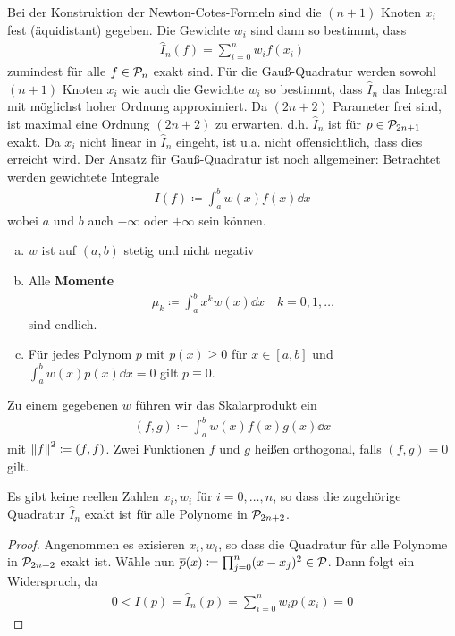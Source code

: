 Bei der Konstruktion der Newton-Cotes-Formeln sind die
$(n+1)$ Knoten $x_i$ fest (äquidistant) gegeben.
Die Gewichte $w_i$ sind dann so bestimmt, dass
\begin{gather*}
  \hat{I}_n(f) =\sum_{i=0}^n w_if(x_i)
\end{gather*}
zumindest für alle $f\in\p_n$ exakt sind.
Für die Gauß-Quadratur werden sowohl $(n+1)$ Knoten $x_i$
wie auch die Gewichte $w_i$ so bestimmt, dass
$\hat{I}_n$ das Integral
mit möglichst hoher Ordnung approximiert.
Da $(2n+2)$ Parameter frei sind,
ist maximal eine Ordnung $(2n+2)$ zu erwarten,
d.h. $\hat{I}_n$ ist für $p\in\p_{2n+1}$ exakt.
Da $x_i$ nicht linear in $\hat{I}_n$ eingeht,
ist u.a. nicht offensichtlich,
dass dies erreicht wird.
Der Ansatz für Gauß-Quadratur ist noch allgemeiner:
Betrachtet werden gewichtete Integrale
\begin{gather}
  I(f) \coloneqq \int_a^bw(x)f(x)\dd x
  \label{VII.4.1}
\end{gather}
wobei $a$ und $b$ auch $-\infty$ oder $+\infty$ sein können.

\begin{enumerate}[a)]
\item $w$ ist auf $(a,b)$ stetig und nicht negativ 
\item Alle \textbf{Momente}
  \begin{gather*}
    \mu_k\coloneqq \int_a^b x^kw(x)\dd x\quad k=0,1,\dotsc
  \end{gather*}
  sind endlich.
\item Für jedes Polynom $p$ mit $p(x) \geq 0$
  für $x\in[a,b]$ und $\int_a^bw(x)p(x)\dd x=0$
  gilt $p\equiv 0$.
\end{enumerate}
Zu einem gegebenen $w$ führen wir das
Skalarprodukt ein
\begin{gather}
  (f,g)\coloneqq \int_a^bw(x)f(x)g(x)\dd x 
  \label{VII.4.2}
\end{gather}
mit $\nn[f]^2\coloneqq (f,f)$.
Zwei Funktionen $f$ und $g$ heißen orthogonal,
falls $(f,g)=0$ gilt.

\begin{Leme}
  \label{7.4.2}
  Es gibt keine reellen Zahlen $x_i, w_i$ für $i=0,\dotsc,n$,
  so dass die zugehörige Quadratur $\hat{I}_n$ exakt ist
  für alle Polynome in $\p_{2n+2}$.

  \begin{proof}
    Angenommen es exisieren $x_i,w_i$, so dass die Quadratur
    für alle Polynome in $\p_{2n+2}$ exakt ist.
    Wähle nun $\overline{p}(x)\coloneqq
    \prod_{j=0}^n(x-x_j)^2\in\p$.
    Dann folgt ein Widerspruch, da
    \begin{gather*}
      0<I(\overline{p})=\hat{I}_n(\overline{p})
      =\sum_{i=0}^nw_i\overline{p}(x_i) = 0
    \end{gather*}
  \end{proof}
\end{Leme}


